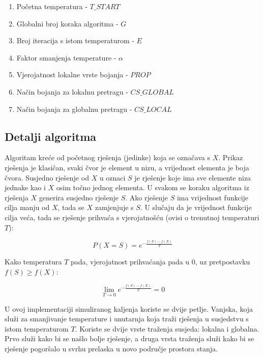 \documentclass[times, utf8, diplomski, numeric]{fer}
\begin{document}
\begin{enumerate}
	\item Početna temperatura - $T\_START$
	\item Globalni broj koraka algoritma - $G$
	\item Broj iteracija s istom temperaturom - $E$
	\item Faktor smanjenja temperature - $\alpha$
	\item Vjerojatnost lokalne vrste bojanja - $PROP$
	\item Način bojanja za lokalnu pretragu - $CS\_GLOBAL$
	\item Način bojanja za globalnu pretragu - $CS\_LOCAL$
\end{enumerate}

\subsection{Detalji algoritma}

Algoritam kreće od početnog rješenja (jedinke) koja se označava s $X$. Prikaz rješenja je klasičan, svaki čvor je element u nizu, a vrijednost  elementa je boja čvora. Susjedno rješenje od $X$ u oznaci $S$ je rješenje koje ima sve elemente niza jednake kao i $X$ osim točno jednog elementa. U svakom se koraku algoritma iz rješenja $X$ generira susjedno rješenje $S$. Ako rješenje $S$ ima vrijednost funkcije cilja manju od $X$, tada se $X$ zamjenjuje s $S$. U slučaju da je vrijednost funkcije cilja veća, tada se rješenje prihvaća s vjerojatnošću (ovisi o trenutnoj temperaturi $T$):
 
\begin{equation}
	P(X=S) = e^{-\frac{f(S)-f(X)}{T}}
\end{equation}

Kako temperatura $T$ pada, vjerojatnost prihvaćanja pada u $0$, uz pretpostavku $f(S)\ge f(X)$:

\begin{equation}
	\lim_{T\rightarrow 0 } e^{-\frac{f(S)-f(X)}{T}} = 0	
\end{equation}

U ovoj implementaciji simuliranog kaljenja koriste se dvije petlje. Vanjska, koja služi za smanjivanje temperature i unutarnja koja traži rješenja u susjedstvu s istom temperaturom $T$. Koriste se dvije vrste traženja susjeda: lokalna i globalna. Prvo služi kako bi se našlo bolje rješenje, a druga vrsta traženja služi kako bi se rješenje pogoršalo u svrhu prelaska u novo područje prostora stanja. 
\end{document}
